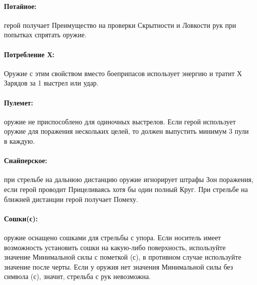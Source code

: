 \paragraph{Потайное:} герой получает Преимущество на проверки Скрытности и Ловкости рук при попытках спрятать оружие.
\paragraph{Потребление Х:} Оружие с этим свойством вместо боеприпасов использует энергию и тратит Х Зарядов за 1 выстрел или удар.
\paragraph{Пулемет:} оружие не приспособлено для одиночных выстрелов. Если герой использует оружие для поражения нескольких целей, то должен выпустить минимум 3 пули в каждую.
\paragraph{Снайперское:} при стрельбе на дальнюю дистанцию оружие игнорирует штрафы Зон поражения, если герой проводит Прицеливаясь хотя бы один полный Круг. При стрельбе на ближней дистанции герой получает Помеху.
\paragraph{Сошки(с):} оружие оснащено сошками для стрельбы с упора. Если носитель имеет возможность установить сошки на какую-либо поверхность, используйте значение Минимальной силы с пометкой (с), в противном случае используйте значение после черты. Если у оружия нет значения Минимальной силы без символа (с), значит, стрельба с рук невозможна.
